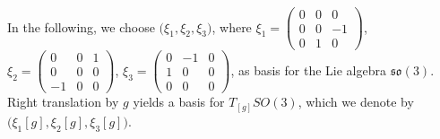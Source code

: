 \documentclass[11pt]{article}
\numberwithin{equation}{section} \setlength{\topmargin}{-35pt}
\begin{document}
\medskip
\noindent In the following, we choose $\bigl(\xi_1, \xi_2,
\xi_3\bigr)$, where  $\xi_1=\begin{pmatrix}
0&0&0\\ 0&0&-1\\ 0&1&0\end{pmatrix}$, $\xi_2=\begin{pmatrix} 0&0&1\\
0&0&0\\ -1&0&0\end{pmatrix}$, $\xi_3=\begin{pmatrix} 0&-1&0\\
1&0&0\\ 0&0&0\end{pmatrix}$, as basis for the Lie algebra
 $\mathfrak{so}(3)$. Right translation by $g$ yields a basis for
$T_{[g]}SO(3)$, which we denote by $\bigl(\xi_1[g], \xi_2[g],
\xi_3[g]\bigr)$.
\end{document}
